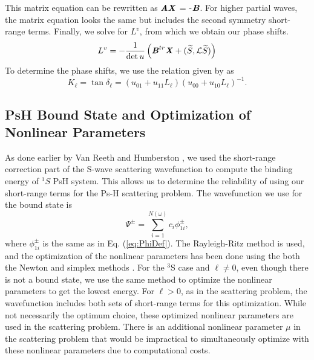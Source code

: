 \documentclass[preprint,showpacs,preprintnumbers,amsmath,amssymb]{revtex4}
\begin{document}
This matrix equation can be rewritten as $\textbf{\emph{AX}}$ = -$\textbf{\emph{B}}$. For higher partial waves, the matrix equation looks the same but includes the second symmetry short-range terms. Finally, we solve for $L^v$, from which we obtain our phase shifts.
\begin{equation}
L^v = -\frac{1}{\det u} \left( \textbf{\emph{B}}^{tr} \textbf{\emph{X}} + (\widetilde{S},\mathcal{L} \widetilde{S}) \right)
\end{equation}
To determine the phase shifts, we use the relation given by \cite{Lucchese1989} as
\begin{equation}
K_\ell = \tan \delta_\ell = (u_{01} + u_{11} L_\ell)(u_{00} + u_{10} L_\ell)^{-1}.
\end{equation}



\subsection{PsH Bound State and Optimization of Nonlinear Parameters}
As done earlier by Van Reeth and Humberston \cite{VanReeth2003,VanReeth2004}, we used the short-range correction part of the S-wave scattering wavefunction to compute the binding energy of $^1S$ PsH system. This allows us to determine the reliability of using our short-range terms for the Ps-H scattering problem. The wavefunction we use for the bound state is
\begin{equation}
\label{eq:BoundWavefn}
\Psi^\pm = \sum_{i=1}^{N(\omega)} c_i \phi_{1i}^\pm,
\end{equation}
where $\phi_{1i}^\pm$ is the same as in Eq. (\ref{eq:PhiDef}). The Rayleigh-Ritz method is used, and the optimization of the nonlinear parameters has been done using the both the Newton and simplex methods \cite{Yan1999,GSL}. For the $^3$S case and $\ell \neq 0$, even though there is not a bound state, we use the same method to optimize the nonlinear parameters to get the lowest energy. For $\ell > 0$, as in the scattering problem, the wavefunction includes both sets of short-range terms for this optimization. While not necessarily the optimum choice, these optimized nonlinear parameters are used in the scattering problem. There is an additional nonlinear parameter $\mu$ in the scattering problem that would be impractical to simultaneously optimize with these nonlinear parameters due to computational costs.
\end{document}
